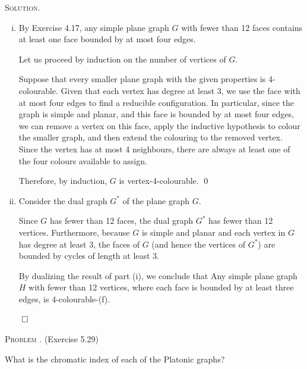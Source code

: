 \documentclass[12pt, a4paper, oneside]{ctexart}
\newcounter{problemname}
\newenvironment{problem}{\begin{framed}\stepcounter{problemname}\par\noindent\textsc{Problem \arabic{problemname}. }}{\end{framed}\par}
\newenvironment{solution}{%
	\par\noindent\textsc{Solution. }\ignorespaces
}{%
	\hfill$\qed$\par
}
\begin{document}
	\begin{solution}
		
		\begin{enumerate}[(i)]
			\item By Exercise 4.17, any simple plane graph \( G \) with fewer than 12 faces contains at least one face 
			bounded by at most four edges. 

			Let us proceed by induction on the number of vertices of \( G \).

			Suppose that every smaller plane graph with the given properties is 4-colourable. 
			Given that each vertex has degree at least 3, we use the face with at most four edges 
			to find a reducible configuration. In particular, since the graph is simple and planar, 
			and this face is bounded by at most four edges, we can remove a vertex on this face, apply the inductive 
			hypothesis to colour the smaller graph, and then extend the colouring to the removed vertex. 
			Since the vertex has at most 4 neighbours, there are always at least one of the four colours available to assign.

			Therefore, by induction, \( G \) is vertex-4-colourable. \qed
			\item 
				Consider the dual graph \( G^* \) of the plane graph \( G \). 

				Since \( G \) has fewer than 12 faces, the dual graph \( G^* \) has fewer than 12 vertices. 
				Furthermore, because \( G \) is simple and planar and each vertex in \( G \) has degree at least 3, 
				the faces of \( G \) (and hence the vertices of \( G^* \)) are bounded by cycles of length at least 3.

				By dualizing the result of part (i), we conclude that Any simple plane graph \( H \) with fewer 
				than 12 vertices, where each face is bounded by at least three edges, is 4-colourable-(f).
		\end{enumerate}

	\end{solution}

	\begin{problem}
		(Exercise 5.29)

        What is the chromatic index of each of the Platonic graphs?
        
    
	\end{problem}
    
\end{document}
